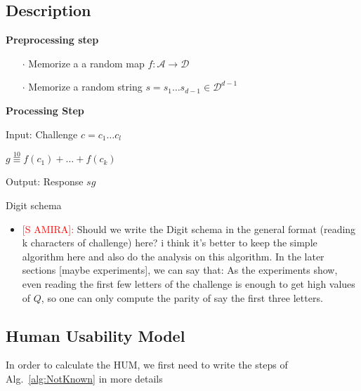 \documentclass[anon,12pt]{colt2016}
\newenvironment{alg}{
    \begin{list}{}{
        \setlength{\itemsep}{2pt}
        \setlength{\parsep}{0pt}
        \setlength{\parskip}{0pt}
        \setlength{\topsep}{1pt}
    }
}
{
    \end{list}
}
\begin{document}
\subsection{Description}

\noindent \textbf{Preprocessing step}

\begin{itemize}
	\item[$\cdot$] Memorize a a random map $f:\mathcal{A} \to \mathcal{D}$
	\item[$\cdot$] Memorize a random string $s = s_1 \ldots s_{d-1}\in \mathcal{D}^{d-1}$
\end{itemize}


\noindent \textbf{Processing Step}

\begin{algorithm}
\label{OneDigit}
\begin{alg}
\item[] Input: Challenge $c=c_1 \ldots c_l$
\item[] $g \overset{10}{\equiv} f(c_1)+\ldots +f(c_k)$
\item[] Output: Response $sg$
\label{alg:NotKnown}
\end{alg}
\caption{Digit schema}
\end{algorithm}

\begin{itemize}
	\item \textcolor{red}{[S	AMIRA]:} Should we write the Digit schema in the general format (reading k characters of challenge) here? i think it's better to keep the simple algorithm here and also do the analysis on this algorithm. In the later sections [maybe experiments], we can say that: As the experiments show, even reading the first few letters of the challenge is enough to get high values of $Q$, so one can only compute the parity of say the first three letters.
\end{itemize}

\subsection{Human Usability Model}


In order to calculate the HUM, we first need to write the steps of Alg.~\ref{alg:NotKnown} in more details
\end{document}
